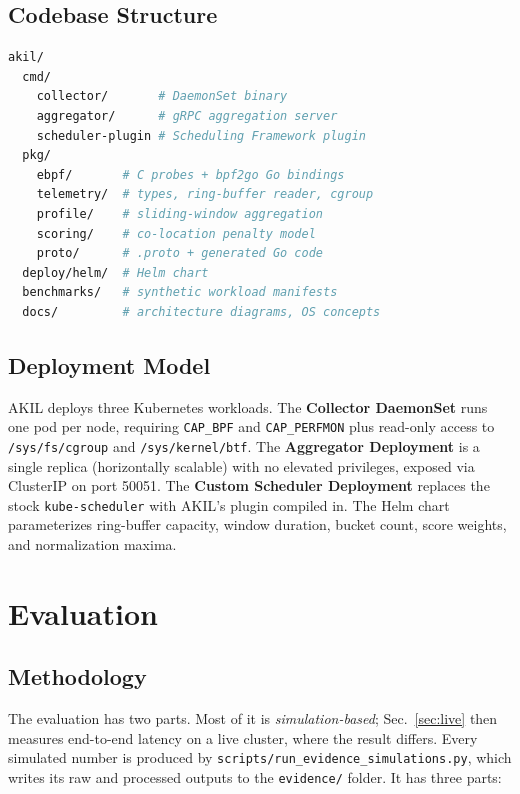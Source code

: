 \documentclass[10pt,conference,a4paper]{IEEEtran}
\begin{document}
\subsection{Codebase Structure}

\begin{lstlisting}[language=bash, caption={Repository layout}]
akil/
  cmd/
    collector/       # DaemonSet binary
    aggregator/      # gRPC aggregation server
    scheduler-plugin # Scheduling Framework plugin
  pkg/
    ebpf/       # C probes + bpf2go Go bindings
    telemetry/  # types, ring-buffer reader, cgroup
    profile/    # sliding-window aggregation
    scoring/    # co-location penalty model
    proto/      # .proto + generated Go code
  deploy/helm/  # Helm chart
  benchmarks/   # synthetic workload manifests
  docs/         # architecture diagrams, OS concepts
\end{lstlisting}

\subsection{Deployment Model}

AKIL deploys three Kubernetes workloads. The \textbf{Collector DaemonSet} runs
one pod per node, requiring \texttt{CAP\_BPF} and \texttt{CAP\_PERFMON} plus
read-only access to \texttt{/sys/fs/cgroup} and \texttt{/sys/kernel/btf}.
The \textbf{Aggregator Deployment} is a single replica (horizontally scalable)
with no elevated privileges, exposed via ClusterIP on port 50051.
The \textbf{Custom Scheduler Deployment} replaces the stock \texttt{kube-scheduler}
with AKIL's plugin compiled in. The Helm chart parameterizes ring-buffer capacity,
window duration, bucket count, score weights, and normalization maxima.

\section{Evaluation}
\label{sec:eval}

\subsection{Methodology}

The evaluation has two parts. Most of it is \emph{simulation-based}; Sec.~\ref{sec:live}
then measures end-to-end latency on a live cluster, where the result differs.
Every simulated number is produced by \texttt{scripts/run\_evidence\_simulations.py},
which writes its raw and processed outputs to the \texttt{evidence/} folder.
It has three parts:
\end{document}

